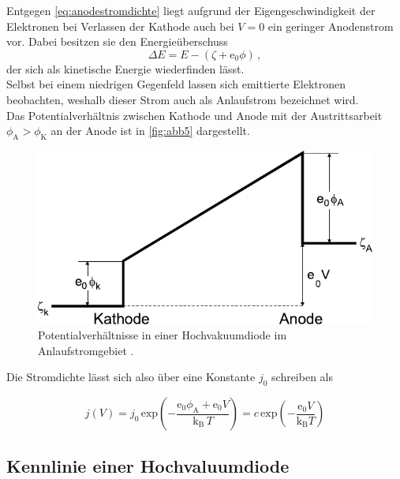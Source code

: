 Entgegen \eqref{eq:anodestromdichte} liegt aufgrund der Eigengeschwindigkeit der Elektronen bei Verlassen
der Kathode auch bei $V = 0$ ein geringer Anodenstrom vor.
Dabei besitzen sie den Energieüberschuss
\begin{equation*}
    \Delta E = E - (\zeta + \text{e}_0 \phi) \,,
\end{equation*}
der sich als kinetische Energie wiederfinden lässt. \\

Selbst bei einem niedrigen Gegenfeld lassen sich emittierte Elektronen beobachten,
weshalb dieser Strom auch als Anlaufstrom bezeichnet wird. \\

Das Potentialverhältnis zwischen Kathode und Anode mit der
Austrittsarbeit $\phi_\text{A} > \phi_\text{K}$ an der Anode
ist in \autoref{fig:abb5} dargestellt.

\begin{figure}[H]
    \centering
    \includegraphics{figures/Abb5.pdf}
    \caption{Potentialverhältnisse in einer Hochvakuumdiode im Anlaufstromgebiet \cite{ap09}.}
    \label{fig:abb5}
\end{figure}

Die Stromdichte lässt sich also über eine Konstante $j_0$ schreiben als

\begin{equation*}
    j(V) = j_0 \, \text{exp}\left(-\dfrac{\text{e}_0 \phi_\text{A} + \text{e}_0 V}{\text{k}_\text{B} \, T} \right)
         = c \,\text{exp}\left(-\dfrac{\text{e}_0 V}{\text{k}_\text{B} T} \right)
\end{equation*}


\subsection{Kennlinie einer Hochvaluumdiode}

